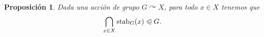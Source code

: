 \documentclass{article}
\newtheorem{proposition}[theorem]{Proposición}
\theoremstyle{definition}
\theoremstyle{remark}
\numberwithin{equation}{section}
\newcommand{\acts}{\curvearrowright}
\newcommand{\normal}{\trianglelefteqslant}
\newcommand{\stab}{\mathrm{stab}}
\newcommand{\fecha}[1]{\begin{flushright} \underline{#1} \end{flushright}}
\begin{document}
\begin{proposition}
  Dada una acción de grupo $G \acts X$, para todo $x \in X$ tenemos que
  $$\bigcap_{x \in X} \stab_G(x) \normal G.$$
\end{proposition}

\end{document}
